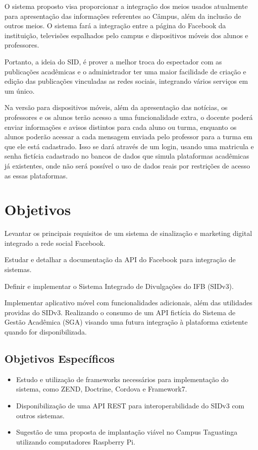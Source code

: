 O sistema proposto visa proporcionar a integração dos meios usados atualmente para apresentação das informações referentes ao Câmpus, além da inclusão de outros meios. O sistema fará a integração entre a página do Facebook da instituição, televisões espalhados pelo campus e dispositivos móveis dos alunos e professores.

Portanto, a ideia do SID, é prover a melhor troca do espectador com as publicações acadêmicas e o administrador ter uma maior facilidade de criação e edição das publicações vinculadas as redes sociais, integrando vários serviços em um único.

Na versão para dispositivos móveis, além da apresentação das notícias, os professores e os alunos terão acesso a uma funcionalidade extra, o docente poderá enviar informações e avisos distintos para cada aluno ou turma, enquanto os alunos poderão acessar a cada mensagem enviada pelo professor para a turma em que ele está cadastrado. Isso se dará através de um login, usando uma matricula e senha fictícia cadastrado no bancos de dados que simula plataformas acadêmicas já existentes, onde não será possível o uso de dados reais por restrições de acesso as essas plataformas.

\section{Objetivos}
Levantar os principais requisitos de um sistema de sinalização e marketing digital integrado a rede social Facebook.

Estudar e detalhar a documentação da API do Facebook para integração de sistemas.

Definir e implementar o Sistema Integrado de Divulgações do IFB (SIDv3).

Implementar aplicativo móvel com funcionalidades adicionais, além das utilidades providas do SIDv3. Realizando o consumo de um API fictícia do Sistema de Gestão Acadêmica (SGA) visando uma futura integração à plataforma existente quando for disponibilizada.

\subsection{Objetivos Específicos}
	 \begin{itemize}
	\item Estudo e utilização de frameworks necessários para implementação do sistema, como ZEND, Doctrine, Cordova e Framework7.
	 	
	\item Disponibilização de uma API REST para interoperabilidade do SIDv3 com outros sistemas.
	
	\item Sugestão de uma proposta de implantação viável no Campus Taguatinga utilizando computadores Raspberry Pi.
	\end{itemize}
	
